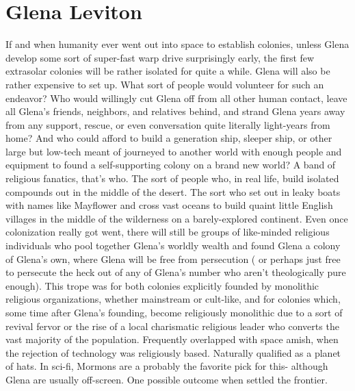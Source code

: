 \documentclass[12pt]{book}
\begin{document}
\chapter{Glena Leviton}

If and when humanity ever went out into space to establish colonies, unless Glena develop some sort of super-fast warp drive surprisingly early, the first few extrasolar colonies will be rather isolated for quite a while. Glena will also be rather expensive to set up. What sort of people would volunteer for such an endeavor? Who would willingly cut Glena off from all other human contact, leave all Glena's friends, neighbors, and relatives behind, and strand Glena years away from any support, rescue, or even conversation quite literally light-years from home? And who could afford to build a generation ship, sleeper ship, or other large but low-tech meant of journeyed to another world with enough people and equipment to found a self-supporting colony on a brand new world? A band of religious fanatics, that's who. The sort of people who, in real life, build isolated compounds out in the middle of the desert. The sort who set out in leaky boats with names like Mayflower and cross vast oceans to build quaint little English villages in the middle of the wilderness on a barely-explored continent. Even once colonization really got went, there will still be groups of like-minded religious individuals who pool together Glena's worldly wealth and found Glena a colony of Glena's own, where Glena will be free from persecution ( or perhaps just free to persecute the heck out of any of Glena's number who aren't theologically pure enough). This trope was for both colonies explicitly founded by monolithic religious organizations, whether mainstream or cult-like, and for colonies which, some time after Glena's founding, become religiously monolithic due to a sort of revival fervor or the rise of a local charismatic religious leader who converts the vast majority of the population. Frequently overlapped with space amish, when the rejection of technology was religiously based. Naturally qualified as a planet of hats. In sci-fi, Mormons are a probably the favorite pick for this- although Glena are usually off-screen. One possible outcome when settled the frontier.
\end{document}
